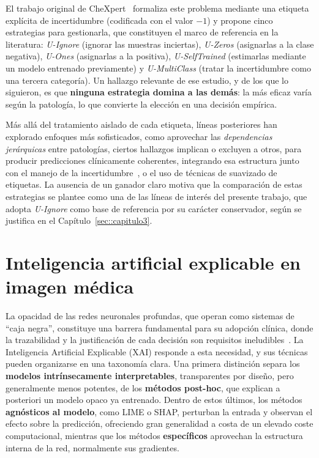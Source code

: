 El trabajo original de CheXpert~\cite{irvinCheXpertLargeChest2019} formaliza este
problema mediante una etiqueta explícita de incertidumbre (codificada con el valor
$-1$) y propone cinco estrategias para gestionarla, que constituyen el marco de
referencia en la literatura: \textit{U-Ignore} (ignorar las muestras inciertas),
\textit{U-Zeros} (asignarlas a la clase negativa), \textit{U-Ones} (asignarlas a
la positiva), \textit{U-SelfTrained} (estimarlas mediante un modelo entrenado
previamente) y \textit{U-MultiClass} (tratar la incertidumbre como una tercera
categoría). Un hallazgo relevante de ese estudio, y de los que lo siguieron, es
que \textbf{ninguna estrategia domina a las demás}: la más eficaz varía según la
patología, lo que convierte la elección en una decisión empírica.

Más allá del tratamiento aislado de cada etiqueta, líneas posteriores han
explorado enfoques más sofisticados, como aprovechar las \textit{dependencias
jerárquicas} entre patologías, ciertos hallazgos implican o excluyen a otros, 
para producir predicciones clínicamente coherentes, integrando esa estructura
junto con el manejo de la incertidumbre~\cite{phamInterpretingChestXrays2021}, o
el uso de técnicas de suavizado de etiquetas. La ausencia de un ganador claro
motiva que la comparación de estas estrategias se plantee como una de las líneas
de interés del presente trabajo, que adopta \textit{U-Ignore} como base de
referencia por su carácter conservador, según se justifica en el
Capítulo~\ref{sec::capitulo3}.


\section{Inteligencia artificial explicable en imagen médica}
\label{sec::ec_xai}

La opacidad de las redes neuronales profundas, que operan como sistemas de
``caja negra'', constituye una barrera fundamental para su adopción clínica,
donde la trazabilidad y la justificación de cada decisión son requisitos
ineludibles~\cite{lizlopezDeepLearningInnovations2025, lizEnsemblesConvolutional2021}.
La Inteligencia Artificial Explicable (XAI) responde a esta necesidad, y sus
técnicas pueden organizarse en una taxonomía clara. Una primera distinción separa
los \textbf{modelos intrínsecamente interpretables}, transparentes por diseño,
pero generalmente menos potentes, de los \textbf{métodos post-hoc}, que explican a
posteriori un modelo opaco ya entrenado. Dentro de estos últimos, los métodos
\textbf{agnósticos al modelo}, como LIME o SHAP, perturban la entrada y observan
el efecto sobre la predicción, ofreciendo gran generalidad a costa de un elevado
coste computacional, mientras que los métodos \textbf{específicos} aprovechan la
estructura interna de la red, normalmente sus gradientes.

